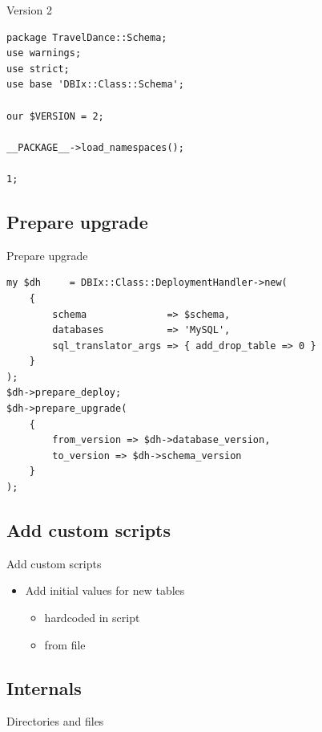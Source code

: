 \begin{frame}[fragile]{Version 2}
\begin{lstlisting}
package TravelDance::Schema;
use warnings;
use strict;
use base 'DBIx::Class::Schema';

our $VERSION = 2;

__PACKAGE__->load_namespaces();

1;
\end{lstlisting}
\end{frame}

\subsection{Prepare upgrade}

\begin{frame}[fragile]{Prepare upgrade}
\begin{lstlisting}
my $dh     = DBIx::Class::DeploymentHandler->new(
    {
        schema              => $schema,
        databases           => 'MySQL',
        sql_translator_args => { add_drop_table => 0 }
    }
);
$dh->prepare_deploy;
$dh->prepare_upgrade(
    {
        from_version => $dh->database_version,
        to_version => $dh->schema_version
    }
);
\end{lstlisting}
\end{frame}

\subsection{Add custom scripts}

\begin{frame}{Add custom scripts}
\begin{itemize}
\item Add initial values for new tables
\begin{itemize}
\item hardcoded in script
\item from file
\end{itemize}
\end{itemize}
\end{frame}

\subsection{Internals}

\begin{frame}{Directories and files}
\end{frame}



